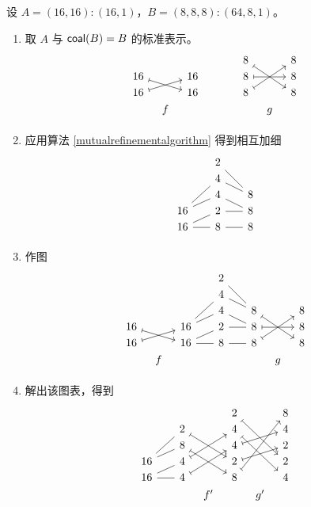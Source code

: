 \begin{example}
    设 $A =(16,16):(16,1)$，$B = (8,8,8):(64,8,1)$。
    \begin{enumerate}
        \item 取 $A$ 与 $\mathsf{coal}(B) = B$ 的标准表示。
        \[ \begin{tikzcd} [row sep = 1, column sep = 8]
         & & & & & & 8 \ar[ddrr,mapsto] & & 8\\
        16 \ar[drr,mapsto] & & 16 & & & & 8 \ar[rr,mapsto] & & 8\\
        16 \ar[urr,mapsto] & & 16 & & & & 8 \ar[uurr,mapsto] & & 8\\
        & f & & & & & & g & \\
        \end{tikzcd} \]
        \item 应用算法 \ref{mutualrefinementalgorithm} 得到相互加细
        \[ \begin{tikzcd} [row sep = 1, column sep = 8]
        & & 2 \ar[-,ddrr]& & \\
           & & 4 \ar[-,drr] & &  \\
          & & 4 \ar[-,drr] & & 8 \\
         16  \ar[-,urr] \ar[-,uurr]  & & 2 \ar[-,rr] & & 8 \\
        16 \ar[rr,-] \ar[urr,-]& & 8 \ar[-,swap,rr] & & 8 \\
           &  & &  &  \\
        \end{tikzcd} \]
        \item 作图
        \[
\begin{tikzcd}[row sep = 1,column sep = 8]
 & & & & 2 \ar[ddrr,-]& & & & \\
  & &   & & 4  \ar[drr,-] & &    & &\\
  & &   & & 4 \ar[drr,-]  & & 8  \ar[ddrr,mapsto] & & 8\\
16 \ar[drr,mapsto] & & 16 \ar[urr,-] \ar[rruu,-] & & 2 \ar[rr,-]& & 8  \ar[rr,mapsto] & & 8\\
16 \ar[urr,mapsto] & & 16 \ar[rr,-] \ar[urr,-] & & 8 \ar[rr,-] & & 8 \ar[uurr,mapsto] & & 8 \\
 & f & &  & & &    &g& \\
\end{tikzcd}
\]

        \item 解出该图表，得到
        \[ \begin{tikzcd} [row sep = 1, column sep = 8]
         & & & & 2 \ar[rrddd,mapsto] & & 8 \\
         & & 2 \ar[rrdd,mapsto] & & 4 \ar[rrddd,mapsto] & & 4 \\
         & & 8 \ar[ddrr,mapsto] & & 4 \ar[urr,mapsto] & & 2 \\
        16 \ar[urr,-] \ar[uurr,-] & & 4 \ar[uurr,mapsto] & & 2 \ar[urr,mapsto] & & 2\\
        16 \ar[rr,-] \ar[urr,-] & & 4 \ar[uurr,mapsto] & & 8 \ar[uuuurr,mapsto] & & 4\\
        & & & f' & & g' & \\
        \end{tikzcd} \]


\end{enumerate}
\end{example}
